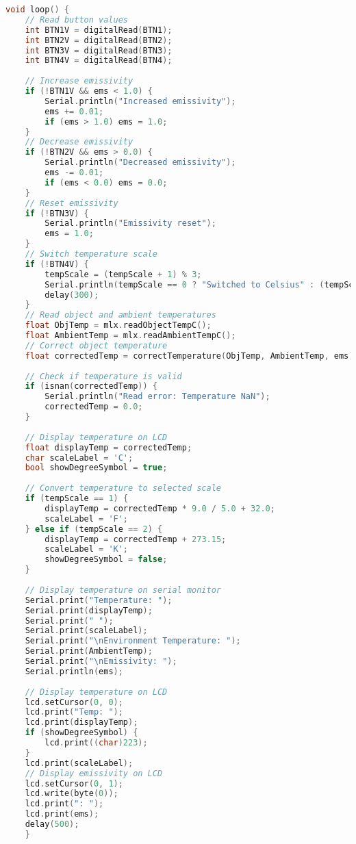 \begin{lstlisting}[language=C++]
void loop() {
    // Read button values
    int BTN1V = digitalRead(BTN1);
    int BTN2V = digitalRead(BTN2);
    int BTN3V = digitalRead(BTN3);
    int BTN4V = digitalRead(BTN4);
    
    // Increase emissivity
    if (!BTN1V && ems < 1.0) {
        Serial.println("Increased emissivity");
        ems += 0.01;
        if (ems > 1.0) ems = 1.0;
    }
    // Decrease emissivity
    if (!BTN2V && ems > 0.0) {
        Serial.println("Decreased emissivity");
        ems -= 0.01;
        if (ems < 0.0) ems = 0.0;
    }
    // Reset emissivity
    if (!BTN3V) {
        Serial.println("Emissivity reset");
        ems = 1.0;
    }
    // Switch temperature scale
    if (!BTN4V) {
        tempScale = (tempScale + 1) % 3;
        Serial.println(tempScale == 0 ? "Switched to Celsius" : (tempScale == 1 ? "Switched to Fahrenheit" : "Switched to Kelvin"));
        delay(300);
    } 
    // Read object and ambient temperatures
    float ObjTemp = mlx.readObjectTempC();
    float AmbientTemp = mlx.readAmbientTempC();
    // Correct object temperature
    float correctedTemp = correctTemperature(ObjTemp, AmbientTemp, ems);
    
    // Check if temperature is valid
    if (isnan(correctedTemp)) {
        Serial.println("Read error: Temperature NaN");
        correctedTemp = 0.0;
    }
    
    // Display temperature on LCD
    float displayTemp = correctedTemp;
    char scaleLabel = 'C';
    bool showDegreeSymbol = true;
    
    // Convert temperature to selected scale
    if (tempScale == 1) {
        displayTemp = correctedTemp * 9.0 / 5.0 + 32.0;
        scaleLabel = 'F';
    } else if (tempScale == 2) {
        displayTemp = correctedTemp + 273.15;
        scaleLabel = 'K';
        showDegreeSymbol = false;
    }
    
    // Display temperature on serial monitor
    Serial.print("Temperature: ");
    Serial.print(displayTemp);
    Serial.print(" ");
    Serial.print(scaleLabel);
    Serial.print("\nEnvironment Temperature: ");
    Serial.print(AmbientTemp);
    Serial.print("\nEmissivity: ");
    Serial.println(ems);
    
    // Display temperature on LCD
    lcd.setCursor(0, 0);
    lcd.print("Temp: ");
    lcd.print(displayTemp);
    if (showDegreeSymbol) {
        lcd.print((char)223);
    }
    lcd.print(scaleLabel);
    // Display emissivity on LCD
    lcd.setCursor(0, 1);
    lcd.write(byte(0));
    lcd.print(": ");
    lcd.print(ems);
    delay(500);
    }
    \end{lstlisting}


